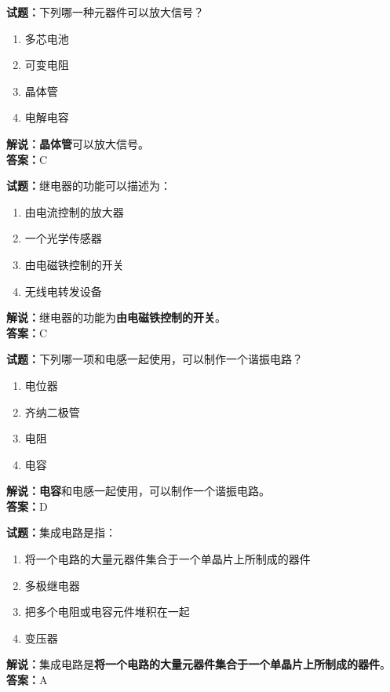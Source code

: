 \documentclass{ctexbook}
\begin{document}
\bigskip


\noindent\textbf{试题：}下列哪一种元器件可以放大信号？
\begin{enumerate}[leftmargin=3em]
\item 多芯电池
\item 可变电阻
\item 晶体管
\item 电解电容
\end{enumerate}
\noindent\textbf{解说：}\textbf{晶体管}可以放大信号。\\\noindent\textbf{答案：}C


\bigskip


\noindent\textbf{试题：}继电器的功能可以描述为：
\begin{enumerate}[leftmargin=3em]
\item 由电流控制的放大器
\item 一个光学传感器
\item 由电磁铁控制的开关
\item 无线电转发设备
\end{enumerate}
\noindent\textbf{解说：}继电器的功能为\textbf{由电磁铁控制的开关}。\\\noindent\textbf{答案：}C


\bigskip


\noindent\textbf{试题：}下列哪一项和电感一起使用，可以制作一个谐振电路？
\begin{enumerate}[leftmargin=3em]
\item 电位器
\item 齐纳二极管
\item 电阻
\item 电容
\end{enumerate}
\noindent\textbf{解说：}\textbf{电容}和电感一起使用，可以制作一个谐振电路。\\\noindent\textbf{答案：}D



\bigskip


\noindent\textbf{试题：}集成电路是指：
\begin{enumerate}[leftmargin=3em]
\item 将一个电路的大量元器件集合于一个单晶片上所制成的器件
\item 多极继电器
\item 把多个电阻或电容元件堆积在一起
\item 变压器
\end{enumerate}
\noindent\textbf{解说：}集成电路是\textbf{将一个电路的大量元器件集合于一个单晶片上所制成的器件}。\\\noindent\textbf{答案：}A
\end{document}
